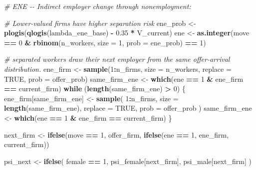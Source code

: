 \documentclass[
]{article}
\newenvironment{Shaded}{\begin{snugshade}}{\end{snugshade}}
\newcommand{\AttributeTok}[1]{\textcolor[rgb]{0.13,0.29,0.53}{#1}}
\newcommand{\CommentTok}[1]{\textcolor[rgb]{0.56,0.35,0.01}{\textit{#1}}}
\newcommand{\ConstantTok}[1]{\textcolor[rgb]{0.56,0.35,0.01}{#1}}
\newcommand{\ControlFlowTok}[1]{\textcolor[rgb]{0.13,0.29,0.53}{\textbf{#1}}}
\newcommand{\DecValTok}[1]{\textcolor[rgb]{0.00,0.00,0.81}{#1}}
\newcommand{\FloatTok}[1]{\textcolor[rgb]{0.00,0.00,0.81}{#1}}
\newcommand{\FunctionTok}[1]{\textcolor[rgb]{0.13,0.29,0.53}{\textbf{#1}}}
\newcommand{\NormalTok}[1]{#1}
\newcommand{\OtherTok}[1]{\textcolor[rgb]{0.56,0.35,0.01}{#1}}
\newcommand{\SpecialCharTok}[1]{\textcolor[rgb]{0.81,0.36,0.00}{\textbf{#1}}}
\begin{document}
\begin{Shaded}
\begin{Highlighting}[]
        \CommentTok{\# ENE {-}{-} Indirect employer change through nonemployment:}

        \CommentTok{\# Lower{-}valued firms have higher separation risk}
\NormalTok{        ene\_prob }\OtherTok{\textless{}{-}} \FunctionTok{plogis}\NormalTok{(}\FunctionTok{qlogis}\NormalTok{(lambda\_ene\_base) }\SpecialCharTok{{-}} \FloatTok{0.35} \SpecialCharTok{*}\NormalTok{ V\_current)}
\NormalTok{        ene }\OtherTok{\textless{}{-}} \FunctionTok{as.integer}\NormalTok{(move }\SpecialCharTok{==} \DecValTok{0} \SpecialCharTok{\&} \FunctionTok{rbinom}\NormalTok{(n\_workers, }\AttributeTok{size =} \DecValTok{1}\NormalTok{, }\AttributeTok{prob =}\NormalTok{ ene\_prob) }\SpecialCharTok{==} \DecValTok{1}\NormalTok{)}

        \CommentTok{\# separated workers draw their next employer from the same offer{-}arrival distribution.}
\NormalTok{        ene\_firm }\OtherTok{\textless{}{-}} \FunctionTok{sample}\NormalTok{(}\DecValTok{1}\SpecialCharTok{:}\NormalTok{n\_firms, }\AttributeTok{size =}\NormalTok{ n\_workers, }\AttributeTok{replace =} \ConstantTok{TRUE}\NormalTok{, }\AttributeTok{prob =}\NormalTok{ offer\_prob)}
\NormalTok{        same\_firm\_ene }\OtherTok{\textless{}{-}} \FunctionTok{which}\NormalTok{(ene }\SpecialCharTok{==} \DecValTok{1} \SpecialCharTok{\&}\NormalTok{ ene\_firm }\SpecialCharTok{==}\NormalTok{ current\_firm)}
        \ControlFlowTok{while}\NormalTok{ (}\FunctionTok{length}\NormalTok{(same\_firm\_ene) }\SpecialCharTok{\textgreater{}} \DecValTok{0}\NormalTok{) \{}
\NormalTok{            ene\_firm[same\_firm\_ene] }\OtherTok{\textless{}{-}} \FunctionTok{sample}\NormalTok{(}
                \DecValTok{1}\SpecialCharTok{:}\NormalTok{n\_firms,}
                \AttributeTok{size =} \FunctionTok{length}\NormalTok{(same\_firm\_ene),}
                \AttributeTok{replace =} \ConstantTok{TRUE}\NormalTok{,}
                \AttributeTok{prob =}\NormalTok{ offer\_prob}
\NormalTok{            )}
\NormalTok{            same\_firm\_ene }\OtherTok{\textless{}{-}} \FunctionTok{which}\NormalTok{(ene }\SpecialCharTok{==} \DecValTok{1} \SpecialCharTok{\&}\NormalTok{ ene\_firm }\SpecialCharTok{==}\NormalTok{ current\_firm)}
\NormalTok{        \}}

\NormalTok{        next\_firm }\OtherTok{\textless{}{-}} \FunctionTok{ifelse}\NormalTok{(move }\SpecialCharTok{==} \DecValTok{1}\NormalTok{, offer\_firm, }\FunctionTok{ifelse}\NormalTok{(ene }\SpecialCharTok{==} \DecValTok{1}\NormalTok{, ene\_firm, current\_firm))}

\NormalTok{        psi\_next }\OtherTok{\textless{}{-}} \FunctionTok{ifelse}\NormalTok{(}
\NormalTok{            female }\SpecialCharTok{==} \DecValTok{1}\NormalTok{,}
\NormalTok{            psi\_female[next\_firm],}
\NormalTok{            psi\_male[next\_firm]}
\NormalTok{        )}


\end{Highlighting}
\end{Shaded}
\end{document}
